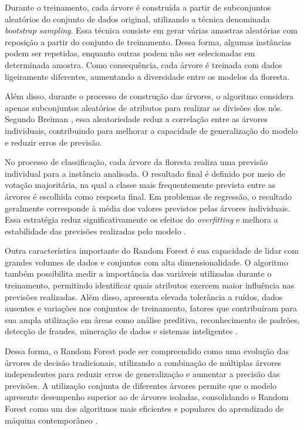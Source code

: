 \documentclass[
    12pt,                %
    openright,           %
    oneside,             %
    a4paper,             %
    english,             %
    brazil               %
]{abntex2}
\begin{document}
Durante o treinamento, cada árvore é construída a partir de subconjuntos aleatórios do conjunto de dados original, utilizando a técnica denominada \textit{bootstrap sampling}. Essa técnica consiste em gerar várias amostras aleatórias com reposição a partir do conjunto de treinamento. Dessa forma, algumas instâncias podem ser repetidas, enquanto outras podem não ser selecionadas em determinada amostra. Como consequência, cada árvore é treinada com dados ligeiramente diferentes, aumentando a diversidade entre os modelos da floresta.

Além disso, durante o processo de construção das árvores, o algoritmo considera apenas subconjuntos aleatórios de atributos para realizar as divisões dos nós. Segundo Breiman \cite{breiman2001}, essa aleatoriedade reduz a correlação entre as árvores individuais, contribuindo para melhorar a capacidade de generalização do modelo e reduzir erros de previsão.

No processo de classificação, cada árvore da floresta realiza uma previsão individual para a instância analisada. O resultado final é definido por meio de votação majoritária, na qual a classe mais frequentemente prevista entre as árvores é escolhida como resposta final. Em problemas de regressão, o resultado geralmente corresponde à média dos valores previstos pelas árvores individuais. Essa estratégia reduz significativamente os efeitos do \textit{overfitting} e melhora a estabilidade das previsões realizadas pelo modelo \cite{breiman2001}.

Outra característica importante do Random Forest é sua capacidade de lidar com grandes volumes de dados e conjuntos com alta dimensionalidade. O algoritmo também possibilita medir a importância das variáveis utilizadas durante o treinamento, permitindo identificar quais atributos exercem maior influência nas previsões realizadas. Além disso, apresenta elevada tolerância a ruídos, dados ausentes e variações nos conjuntos de treinamento, fatores que contribuíram para sua ampla utilização em áreas como análise preditiva, reconhecimento de padrões, detecção de fraudes, mineração de dados e sistemas inteligentes \cite{breiman2001}.

Dessa forma, o Random Forest pode ser compreendido como uma evolução das árvores de decisão tradicionais, utilizando a combinação de múltiplas árvores independentes para reduzir erros de generalização e aumentar a precisão das previsões. A utilização conjunta de diferentes árvores permite que o modelo apresente desempenho superior ao de árvores isoladas, consolidando o Random Forest como um dos algoritmos mais eficientes e populares do aprendizado de máquina contemporâneo \cite{breiman2001}.
\end{document}
